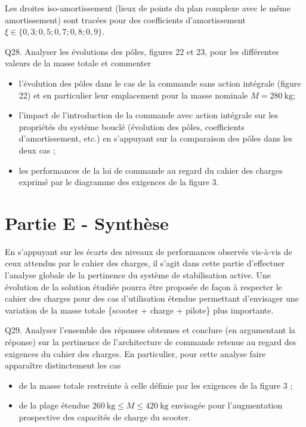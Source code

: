 \documentclass[10pt]{article}
\begin{document}
Les droites iso-amortissement (lieux de points du plan complexe avec le même amortissement) sont tracées pour des coefficients d'amortissement $\xi \in\{0,3 ; 0,5 ; 0,7 ; 0,8 ; 0,9\}$.

Q28. Analyser les évolutions des pôles, figures 22 et 23, pour les différentes valeurs de la masse totale et commenter

\begin{itemize}
  \item[-] l'évolution des pôles dans le cas de la commande sans action intégrale (figure 22) et en particulier leur emplacement pour la masse nominale $M=280 \mathrm{~kg}$;
  \item[-] l'impact de l'introduction de la commande avec action intégrale sur les propriétés du système bouclé (évolution des pôles, coefficients d'amortissement, etc.) en s'appuyant sur la comparaison des pôles dans les deux cas ;
  \item[-] les performances de la loi de commande au regard du cahier des charges exprimé par le diagramme des exigences de la figure 3.
\end{itemize}

\section{Partie E - Synthèse}
En s'appuyant sur les écarts des niveaux de performances observés vis-à-vis de ceux attendus par le cahier des charges, il s'agit dans cette partie d'effectuer l'analyse globale de la pertinence du système de stabilisation active. Une évolution de la solution étudiée pourra être proposée de façon à respecter le cahier des charges pour des cas d'utilisation étendue permettant d'envisager une variation de la masse totale \{scooter + charge + pilote\} plus importante.

Q29. Analyser l'ensemble des réponses obtenues et conclure (en argumentant la réponse) sur la pertinence de l'architecture de commande retenue au regard des exigences du cahier des charges. En particulier, pour cette analyse faire apparaître distinctement les cas

\begin{itemize}
  \item[-] de la masse totale restreinte à celle définie par les exigences de la figure 3 ;
  \item[-] de la plage étendue $260 \mathrm{~kg} \leq M \leq 420 \mathrm{~kg}$ envisagée pour l'augmentation prospective des capacités de charge du scooter.
\end{itemize}
\end{document}
